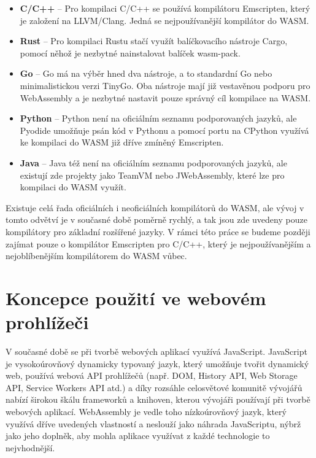 \documentclass{{template/ctuthesis}}
\begin{document}
\begin{itemize}
    \item \textbf{C/C++} – Pro kompilaci C/C++ se používá kompilátoru Emscripten, který je založení na LLVM/Clang. Jedná se nejpoužívanější kompilátor do WASM.
    \item \textbf{Rust} – Pro kompilaci Rustu stačí využít balíčkovacího nástroje Cargo, pomocí něhož je nezbytné nainstalovat balíček wasm-pack.
    \item \textbf{Go} – Go má na výběr hned dva nástroje, a to standardní Go nebo minimalistickou verzi TinyGo. Oba nástroje mají již vestavěnou podporu pro WebAssembly a je nezbytné nastavit pouze správný cíl kompilace na WASM.
    \item \textbf{Python} – Python není na oficiálním seznamu podporovaných jazyků, ale Pyodide umožňuje psán kód v Pythonu a pomocí portu na CPython využívá ke kompilaci do WASM již dříve zmíněný Emscripten.
    \item \textbf{Java} – Java též není na oficiálním seznamu podporovaných jazyků, ale existují zde projekty jako TeamVM nebo JWebAssembly, které lze pro kompilaci do WASM využít.
\end{itemize}

Existuje celá řada oficiálních i neoficiálních kompilátorů do WASM, ale vývoj v tomto odvětví je v současné době poměrně rychlý, a tak jsou zde uvedeny pouze kompilátory pro základní rozšířené jazyky. V rámci této práce se budeme později zajímat pouze o kompilátor Emscripten pro C/C++, který je nejpoužívanějším a nejoblíbenějším kompilátorem do WASM vůbec.



\section{Koncepce použití ve webovém prohlížeči}

V současné době se při tvorbě webových aplikací využívá JavaScript. JavaScript je vysokoúrovňový dynamicky typovaný jazyk, který umožňuje tvořit dynamický web, používá webová API prohlížečů (např. DOM, History API, Web Storage API, Service Workers API atd.) a díky rozsáhle celosvětové komunitě vývojářů nabízí širokou škálu frameworků a knihoven, kterou vývojáři používají při tvorbě webových aplikací. WebAssembly je vedle toho nízkoúrovňový jazyk, který využívá dříve uvedených vlastností a neslouží jako náhrada JavaScriptu, nýbrž jako jeho doplněk, aby mohla aplikace využívat z každé technologie to nejvhodnější.
\end{document}
